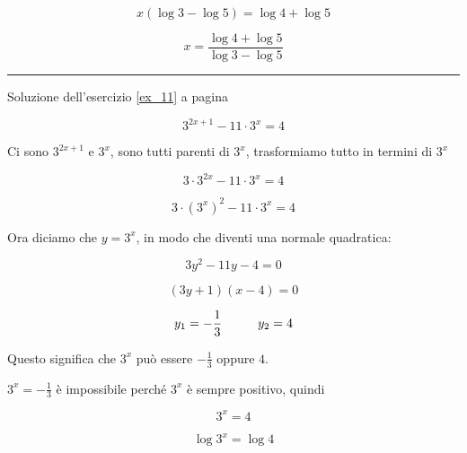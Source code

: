 \begin{equation*}
x(\log3-\log5)=\log4+\log5
\end{equation*}

\begin{equation*}
x=\frac{
\log4+\log5
}{
\log3-\log5
}
\end{equation*}



\vspace{1cm}
\hrule
\vspace{1cm}

Soluzione dell'esercizio \ref{ex_11} a pagina \pageref{ex_11}\label{sol_11}

\begin{equation*}
3^{2x+1}-11\cdot 3^x=4
\end{equation*}


Ci sono $3^{2x+1}$ e $3^x$, sono tutti parenti di $3^x$, trasformiamo tutto in termini di $3^x$

\begin{equation*}
3\cdot 3^{2x}-11\cdot 3^x=4
\end{equation*}

\begin{equation*}
3\cdot {\left(3^x\right)}^2-11\cdot 3^x=4
\end{equation*}

Ora diciamo che $y=3^x$, in modo che diventi una normale quadratica:

\begin{equation*}
3y^2-11y-4=0
\end{equation*}

\begin{equation*}
(3y+1)(x-4)=0
\end{equation*}

\begin{equation*}
y_1=-\frac{1}{3}\textrm{\hspace{1cm}}y_2=4
\end{equation*}

Questo significa che $3^x$ può essere $-\frac{1}{3}$ oppure $4$.

$3^x=-\frac{1}{3}$ è impossibile perché $3^x$ è sempre positivo, quindi

\begin{equation*}
3^x=4
\end{equation*}

\begin{equation*}
\log3^x=\log4
\end{equation*}

